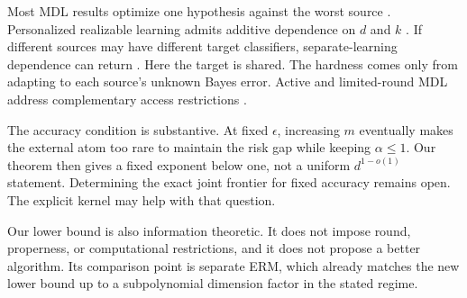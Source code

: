 \documentclass[twoside]{article}
\newcommand{\1}{\mathbf 1}
\begin{document}
Most MDL results optimize one hypothesis against the worst source \citep{haghtalab2022ondemand,zhang2024optimal,peng2024sample}. Personalized realizable learning admits additive dependence on $d$ and $k$ \citep{blum2017collaborative}. If different sources may have different target classifiers, separate-learning dependence can return \citep{deng2024different}. Here the target is shared. The hardness comes only from adapting to each source's unknown Bayes error. Active and limited-round MDL address complementary access restrictions \citep{zhang2025active,haghtalab2025adaptivity}.

The accuracy condition is substantive. At fixed $\epsilon$, increasing $m$ eventually makes the external atom too rare to maintain the risk gap while keeping $\alpha\le1$. Our theorem then gives a fixed exponent below one, not a uniform $d^{1-o(1)}$ statement. Determining the exact joint frontier for fixed accuracy remains open. The explicit kernel may help with that question.

Our lower bound is also information theoretic. It does not impose round, properness, or computational restrictions, and it does not propose a better algorithm. Its comparison point is separate ERM, which already matches the new lower bound up to a subpolynomial dimension factor in the stated regime.



\clearpage
\end{document}
